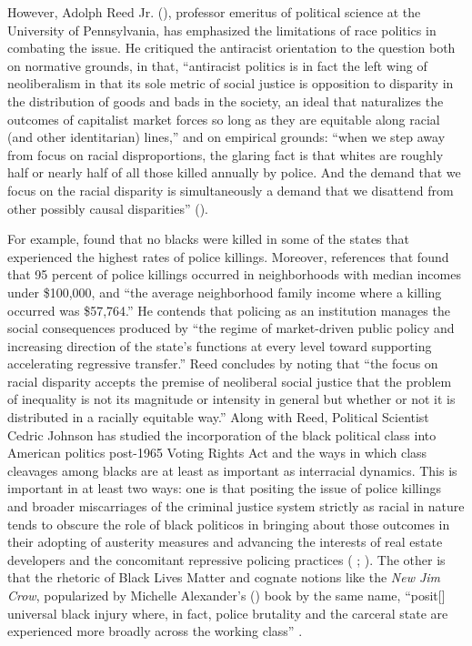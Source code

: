 \documentclass[12pt]{article}
\begin{document}
However, Adolph Reed Jr. (\citeyear{reedHowRacialDisparity2016}), professor emeritus of political science at the University of Pennsylvania, has emphasized the limitations of race politics in combating the issue. He critiqued the antiracist orientation to the question both on normative grounds, in that, “antiracist politics is in fact the left wing of neoliberalism in that its sole metric of social justice is opposition to disparity in the distribution of goods and bads in the society, an ideal that naturalizes the outcomes of capitalist market forces so long as they are equitable along racial (and other identitarian) lines,” and on empirical grounds: “when we step away from focus on racial disproportions, the glaring fact is that whites are roughly half or nearly half of all those killed annually by police. And the demand that we focus on the racial disparity is simultaneously a demand that we disattend from other possibly causal disparities” (\cite{reedHowRacialDisparity2016}).

For example, \textcite{reedHowRacialDisparity2016} found that no blacks were killed in some of the states that experienced the highest rates of police killings. Moreover, \textcite{reedHowRacialDisparity2016} references that \textcite{jilani95PoliceKillings2015} found that 95 percent of police killings occurred in neighborhoods with median incomes under \$100,000, and “the average neighborhood family income where a killing occurred was \$57,764.” He contends that policing as an institution manages the social consequences produced by “the regime of market-driven public policy and increasing direction of the state’s functions at every level toward supporting accelerating regressive transfer.” Reed concludes by noting that “the focus on racial disparity accepts the premise of neoliberal social justice that the problem of inequality is not its magnitude or intensity in general but whether or not it is distributed in a racially equitable way.” Along with Reed, Political Scientist Cedric Johnson has studied the incorporation of the black political class into American politics post-1965 Voting Rights Act and the ways in which class cleavages among blacks are at least as important as interracial dynamics. This is important in at least two ways: one is that positing the issue of police killings and broader miscarriages of the criminal justice system strictly as racial in nature tends to obscure the role of black politicos in bringing about those outcomes in their adopting of austerity measures and advancing the interests of real estate developers and the concomitant repressive policing practices (\citeauthor{johnsonAfterwordBaltimorePolicing2016} \citeyear[305]{johnsonAfterwordBaltimorePolicing2016}; \citeyear[179]{johnsonTrumpismPolicingProblem2019}). The other is that the rhetoric of Black Lives Matter and cognate notions like the \textit{New Jim Crow}, popularized by Michelle Alexander’s (\citeyear{alexanderNewJimCrow2010}) book by the same name, “posit[] universal black injury where, in fact, police brutality and the carceral state are experienced more broadly across the working class” \parencite*[317]{johnsonAfterwordBaltimorePolicing2016}.
\end{document}
